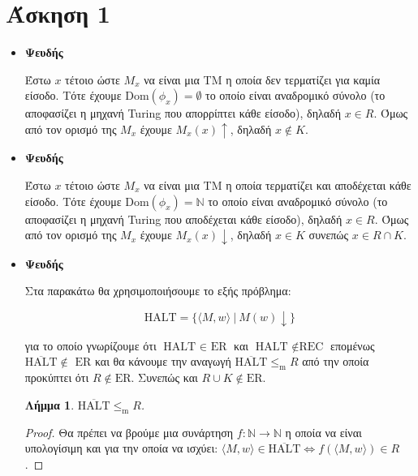 \documentclass[a4paper, oneside, 11pt]{article}
\newcommand{\red}{\leq_{\text{m}}}
\newtheorem{lm}[thm]{Λήμμα}
\theoremstyle{definition}
\begin{document}


\section*{Άσκηση 1}

\begin{itemize}
   \item \textbf{Ψευδής}
   
         Έστω $x$ τέτοιο ώστε $M_x$ να είναι μια TM η οποία δεν τερματίζει για καμία
         είσοδο.  Τότε έχουμε $\text{Dom}(\phi_x) = \emptyset$ το οποίο είναι
         αναδρομικό σύνολο (το αποφασίζει η μηχανή Turing που απορρίπτει κάθε
         είσοδο), δηλαδή $x \in R$. Όμως από τον ορισμό της $M_x$ έχουμε $M_x(x)
         \uparrow$, δηλαδή $x \notin K$.

   \item \textbf{Ψευδής}

         Έστω $x$ τέτοιο ώστε $M_x$ να είναι μια TM η οποία τερματίζει και
         αποδέχεται κάθε είσοδο.
         Τότε έχουμε $\text{Dom}(\phi_x) = \mathbb{N}$ το οποίο είναι
         αναδρομικό σύνολο (το αποφασίζει η μηχανή Turing που αποδέχεται κάθε
         είσοδο), δηλαδή $x \in R$. Όμως από τον ορισμό της $M_x$ έχουμε $M_x(x)
         \downarrow$, δηλαδή $x \in K$ συνεπώς $x \in R \cap K$.

   \item \textbf{Ψευδής}

         Στα παρακάτω θα χρησιμοποιήσουμε το εξής πρόβλημα:

         \[ \text{HALT} = \{ \langle M, w \rangle\ |\ M(w) \downarrow \} \]

         για το οποίο γνωρίζουμε ότι $\text{HALT } \in \text{ ER}$ και
         $\text{HALT } \notin \text{REC}$ επομένως
         $\overline{\text{HALT} } \notin \text{ ER}$ και θα κάνουμε την
         αναγωγή $\overline{\text{HALT} } \red R$ από την οποία
         προκύπτει ότι $R \notin \text{ER}$. Συνεπώς και $R \cup K \notin \text{ER}$.

         \begin{lm}
            $\overline{\text{HALT}} \red R$.
         \end{lm}
         \begin{proof}
            Θα πρέπει να βρούμε μια συνάρτηση $f : \mathbb{N} \rightarrow \mathbb{N}$
            η οποία να είναι υπολογίσιμη και για την οποία
            να ισχύει:
            $\langle M, w \rangle \in \overline{\text{HALT}} \Leftrightarrow
               f(\langle M, w \rangle) \in R$.


\end{proof}
\end{itemize}
\end{document}
